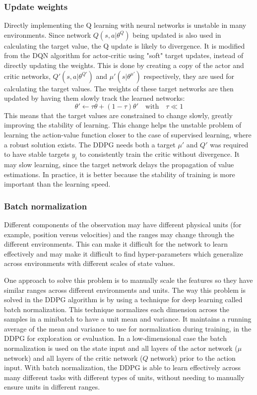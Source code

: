 \subsubsection{Update weights}
Directly implementing the Q learning with neural networks is unstable in many environments. Since network $Q(s,a|\theta^Q)$ being updated is also used in calculating the target value, the Q update is likely to divergence. It is modified from the DQN algorithm for actor-critic using "soft" target updates, instead of directly updating the weights. This is done by creating a copy of the actor and critic networks, $Q'(s,a|\theta^{Q'})$ and $\mu'(s|\theta^{\mu'})$ respectively, they are used for calculating the target values. The weights of these target networks are then updated by having them slowly track the learned networks: 
\begin{equation}
\theta' \leftarrow \tau \theta + (1-\tau)\theta'   \quad \textrm{with} \quad \tau \ll 1 
\end{equation}   
This means that the target values are constrained to change slowly, greatly improving the stability of learning. This change helps the unstable problem of learning the action-value function closer to the case of supervised learning, where a robust solution exists. The DDPG needs both a target $\mu'$ and $Q'$ was required to have stable targets $y_i$ to consistently train the critic without divergence. It may slow learning, since the target network delays the propagation of value estimations. In practice, it is better because the stability of training is more important than the learning speed. 

\subsubsection{Batch normalization}
Different components of the observation may have different physical units (for example, position versus velocities) and the ranges may change through the different environments. This can make it difficult for the network to learn effectively and may make it difficult to find hyper-parameters which generalize across environments with different scales of state values.

One approach to solve this problem is to manually scale the features so they have similar ranges across different environments and units. The way this problem is solved in the DDPG algorithm is by using a technique for deep learning called batch normalization. This technique normalizes each dimension across the samples in a minibatch to have a unit mean and variance. It maintains a running average of the mean and variance to use for normalization during training, in the DDPG for exploration or evaluation. In a low-dimensional case the batch normalization is used on the state input and all layers of the actor network ($\mu$ network) and all layers of the critic network ($Q$ network) prior to the action input. With batch normalization, the DDPG is able to learn effectively across many different tasks with different types of units, without needing to manually ensure units in different ranges.

